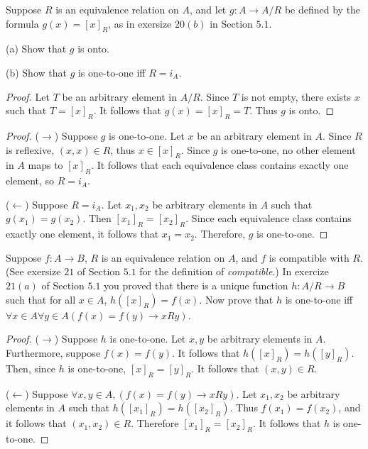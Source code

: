 \begin{tcolorbox}[title=Problem 18, breakable]
    Suppose $R$ is an equivalence relation on $A$,
        and let $g : A \rightarrow A / R$ be defined 
        by the formula $g(x) = [x]_R$, as in exersize $20(b)$
        in Section $5.1$.

    (a) Show that $g$ is onto.

    (b) Show that $g$ is one-to-one iff $R = i_A$.
\end{tcolorbox}

\begin{proof}
    Let $T$ be an arbitrary element in $A / R$.
    Since $T$ is not empty, there exists $x$ such that $T = [x]_R$.
    It follows that $g(x) = [x]_R = T$.
    Thus $g$ is onto.
\end{proof}

\begin{proof}
    ($\rightarrow$) Suppose $g$ is one-to-one.
    Let $x$ be an arbitrary element in $A$.
    Since $R$ is reflexive, $(x, x) \in R$,
        thus $x \in [x]_R$.
    Since $g$ is one-to-one, no other element in $A$
        maps to $[x]_R$.
    It follows that each equivalence class contains exactly one element,
        so $R = i_A$.

    ($\leftarrow$) Suppose $R = i_A$.
    Let $x_1, x_2$ be arbitrary elements in $A$ such that $g(x_1) = g(x_2)$.
    Then $[x_1]_R = [x_2]_R$.
    Since each equivalence class contains exactly one element, it follows that $x_1 = x_2$.
    Therefore, $g$ is one-to-one.
\end{proof}

\begin{tcolorbox}[title=Problem 19, breakable]
    Suppose $f : A \rightarrow B$, $R$ is an equivalence relation on $A$,
        and $f$ is compatible with $R$. (See exersize $21$ of Section $5.1$
        for the definition of \emph{compatible}.)
    In exercize $21(a)$ of Section $5.1$ you proved that there is a unique 
        function $h : A / R \rightarrow B$ such that for all $x \in A$,
        $h([x]_R) = f(x)$. Now prove that $h$ is one-to-one iff
        $\forall{x} \in A \forall{y} \in A (f(x) = f(y) \rightarrow xRy)$.
\end{tcolorbox}

\begin{proof}
    ($\rightarrow$) Suppose $h$ is one-to-one.
    Let $x, y$ be arbitrary elements in $A$.
    Furthermore, suppose $f(x) = f(y)$.
    It follows that $h([x]_R) = h([y]_R)$.
    Then, since $h$ is one-to-one, $[x]_R = [y]_R$.
    It follows that $(x, y) \in R$.

    ($\leftarrow$) Suppose $\forall x, y \in A, (f(x) = f(y) \rightarrow xRy)$.
    Let $x_1, x_2$ be arbitrary elements in $A$
        such that $h([x_1]_R) = h([x_2]_R)$.
    Thus $f(x_1) = f(x_2)$, and it follows that $(x_1, x_2) \in R$.
    Therefore $[x_1]_R = [x_2]_R$.
    It follows that $h$ is one-to-one.
\end{proof}

